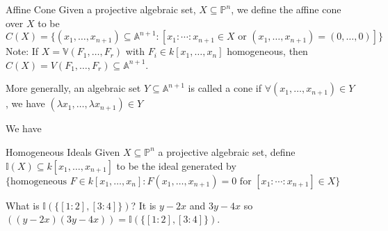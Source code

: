 \documentclass{report}
\begin{document}
%
\begin{definition}{Affine Cone}
    Given a projective algebraic set, $X \subseteq \mathbb{P}^{n}$, we define the affine cone over $X$ to be 
        \begin{equation*}
            C(X) = \{(x_{1}, \ldots, x_{n + 1}) \subseteq \mathbb{A}^{n + 1} : [x_{1} : \cdots : x_{n + 1} \in X \text{ or } (x_{1}, \ldots, x_{n + 1}) = (0, \ldots, 0)]\}
        \end{equation*}
    Note: If $X = \mathbb{V}(F_{1}, \ldots, F_{r})$ with $F_{i} \in k[x_{1}, \ldots, x_{n}]$ homogeneous, then $C(X) = V(F_{1}, \ldots, F_{r}) \subseteq \mathbb{A}^{n + 1}$.
\end{definition}

More generally, an algebraic set $Y \subseteq \mathbb{A}^{n + 1}$ is called a cone if $\forall (x_{1}, \ldots, x_{n + 1}) \in Y$, we have $(\lambda x_{1}, \ldots, \lambda x_{n + 1}) \in Y$

We have
    \begin{center}
    \end{center}

\begin{definition}{Homogeneous Ideals}
    Given $X \subseteq \mathbb{P}^{n}$ a projective algebraic set, define $\mathbb{I}(X) \subseteq k[x_{1}, \ldots, x_{n + 1}]$ to be the ideal generated by $\{\text{homogeneous $F \in k[x_{1}, \ldots, x_{n}] : F(x_{1}, \ldots, x_{n + 1}) = 0$ for $[x_{1} : \cdots : x_{n + 1}] \in X$}\}$
\end{definition}

\begin{examples}
    \begin{example}
        What is $\mathbb{I}(\{[1 : 2], [3 : 4]\})$? It is $y - 2x$ and $3y - 4x$ so $((y - 2x)(3y - 4x)) = \mathbb{I}(\{[1 : 2], [3 : 4]\})$.
    \end{example}
\end{examples}
\end{document}

